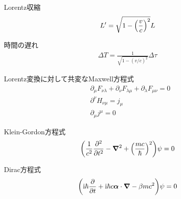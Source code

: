 \documentclass{report}
\begin{document}
  \begin{itembox}[l]{Lorentz収縮}
    \begin{align*}
      L' = \sqrt{1-\qty(\frac{v}{c})^2}L
    \end{align*}
  \end{itembox}
  \begin{itembox}[l]{時間の遅れ}
    \begin{align*}
      \Delta T = \frac{1}{\sqrt{1 - (v/c)^2}} \Delta \tau
    \end{align*}
  \end{itembox}
  \begin{itembox}[l]{Lorentz変換に対して共変なMaxwell方程式}
    \begin{align*}
      &\partial_\mu F_{\nu\lambda} + \partial_\nu F_{\lambda\mu} + \partial_\lambda F_{\mu\nu} = 0\\
      &\partial^{\nu}H_{\nu\mu}=j_\mu\\
      &\partial_\mu j^\mu = 0
    \end{align*}
  \end{itembox}
  \begin{itembox}[l]{Klein-Gordon方程式}
    \begin{align*}
      \qty(\frac{1}{c^2}\frac{\partial^2}{\partial t^2} - \grad^2 + \qty(\frac{mc}{\hbar})^2)\psi = 0
    \end{align*}
  \end{itembox}
  \begin{itembox}[l]{Dirac方程式}
    \begin{align*}
      \qty(\mathrm{i}\hbar \frac{\partial}{\partial t} + \mathrm{i} \hbar c \bm{\alpha}\cdot \grad - \beta mc^2)\psi = 0
    \end{align*}
  \end{itembox}
\end{document}
